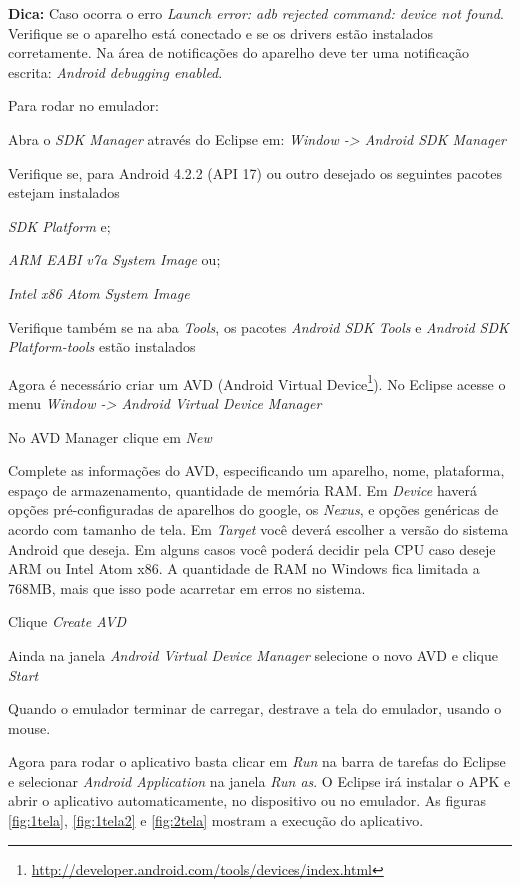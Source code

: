 \documentclass[a4paper,12pt,brazil]{book}
\begin{document}
\begin{singlespace}
\begin{framed}
\textbf{Dica:} Caso ocorra o erro \emph{Launch error: adb rejected command: device not found}. Verifique se o aparelho está conectado e se os drivers estão instalados corretamente. Na área de notificações do aparelho deve ter uma notificação escrita: \emph{Android debugging enabled}. 
\end{framed}


\newpage 
Para rodar no emulador:
\be
\item Abra o \textit{SDK Manager} através do Eclipse em: \textit{Window -> Android SDK Manager}
\item Verifique se, para Android 4.2.2 (API 17) ou outro desejado os seguintes pacotes estejam instalados
	\bi
	\item \textit{SDK Platform} e;
	\item \textit{ARM EABI v7a System Image} ou;
	\item \textit{Intel x86 Atom System Image}
	\ei
\item Verifique também se na aba \textit{Tools}, os pacotes \textit{Android SDK Tools} e \textit{Android SDK Platform-tools} estão instalados
\item Agora é necessário criar um AVD (Android Virtual Device\footnote{\href{http://developer.android.com/tools/devices/index.html}{http://developer.android.com/tools/devices/index.html}}). No Eclipse acesse o menu \textit{Window -> Android Virtual Device Manager} 
\item No AVD Manager clique em \emph{New}
\item Complete as informações do AVD, especificando um aparelho, nome, plataforma, espaço de armazenamento, quantidade de memória RAM. Em \emph{Device} haverá opções pré-configuradas de aparelhos do google, os \emph{Nexus}, e opções genéricas de acordo com tamanho de tela. Em \emph{Target} você deverá escolher a versão do sistema Android que deseja. Em alguns casos você poderá decidir pela CPU caso deseje ARM ou Intel Atom x86. A quantidade de RAM no Windows fica limitada a 768MB, mais que isso pode acarretar em erros no sistema.

\item Clique \emph{Create AVD}
\item Ainda na janela \emph{Android Virtual Device Manager} selecione o novo AVD e clique \emph{Start}
\item Quando o emulador terminar de carregar, destrave a tela do emulador, usando o mouse.
\ee

Agora para rodar o aplicativo basta clicar em \emph{Run} na barra de tarefas do Eclipse e selecionar \textit{Android Application} na janela \emph{Run as}. O Eclipse irá instalar o APK e abrir o aplicativo automaticamente, no dispositivo ou no emulador. As figuras \ref{fig:1tela}, \ref{fig:1tela2} e \ref{fig:2tela} mostram a execução do aplicativo.


\end{singlespace}
\end{document}
